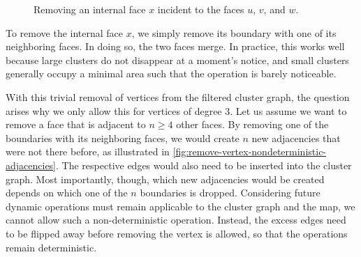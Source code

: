 \begin{figure}[H]
	\centering
	\quad
	\caption{Removing an internal face $x$ incident to the faces $u$, $v$, and $w$.}
	\label{fig:remove-vertex-illustration}
\end{figure}

To remove the internal face $x$, we simply remove its boundary with one of its neighboring faces.
In doing so, the two faces merge.
In practice, this works well because large clusters do not disappear at a moment's notice, and small clusters generally occupy a minimal area such that the operation is barely noticeable.

With this trivial removal of vertices from the filtered cluster graph, the question arises why we only allow this for vertices of degree 3.
Let us assume we want to remove a face that is adjacent to $n \geq 4$ other faces.
By removing one of the boundaries with its neighboring faces, we would create $n$ new adjacencies that were not there before, as illustrated in \cref{fig:remove-vertex-nondeterministic-adjacencies}.
The respective edges would also need to be inserted into the cluster graph.
Most importantly, though, which new adjacencies would be created depends on which one of the $n$ boundaries is dropped.
Considering future dynamic operations must remain applicable to the cluster graph and the map, we cannot allow such a non-deterministic operation.
Instead, the excess edges need to be flipped away before removing the vertex is allowed, so that the operations remain deterministic.

